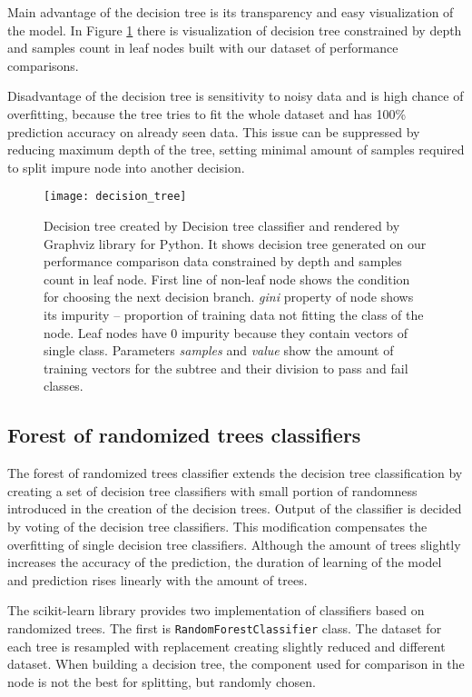 Main advantage of the decision tree is its transparency and easy visualization
of the model. In Figure \ref{fig:decision_tree} there is visualization of
decision tree constrained by depth and samples count in leaf nodes built with
our dataset of performance comparisons.

Disadvantage of the decision tree is sensitivity to noisy data and is high
chance of overfitting, because the tree tries to fit the whole dataset and has
100\% prediction accuracy on already seen data. This issue can be suppressed by
reducing maximum depth of the tree, setting minimal amount of samples required
to split impure node into another decision.

\begin{figure}
  \centering
  \texttt{[image: decision\_tree]}
  \caption{Decision tree created by Decision tree classifier and rendered by
    Graphviz library for Python. It shows decision tree generated on our
    performance comparison data constrained by depth and samples count in leaf
    node. First line of non-leaf node shows the condition for choosing the next
    decision branch. \emph{gini} property of node shows its impurity --
    proportion of training data not fitting the class of the node. Leaf nodes
    have 0 impurity because they contain vectors of single class. Parameters
    \emph{samples} and \emph{value} show the amount of training vectors for the
    subtree and their division to pass and fail classes.}
  \label{fig:decision_tree}
\end{figure}

\subsection{Forest of randomized trees classifiers}
The forest of randomized trees classifier extends the decision tree
classification by creating a set of decision tree classifiers with small portion
of randomness introduced in the creation of the decision trees. Output of the
classifier is decided by voting of the decision tree classifiers. This
modification compensates the overfitting of single decision tree classifiers.
Although the amount of trees slightly increases the accuracy of the prediction,
the duration of learning of the model and prediction rises linearly with the
amount of trees.

The scikit-learn library provides two implementation of classifiers based on
randomized trees. The first is \texttt{RandomForestClassifier} class. The
dataset for each tree is resampled with replacement creating slightly reduced
and different dataset. When building a decision tree, the component used for
comparison in the node is not the best for splitting, but randomly chosen.

